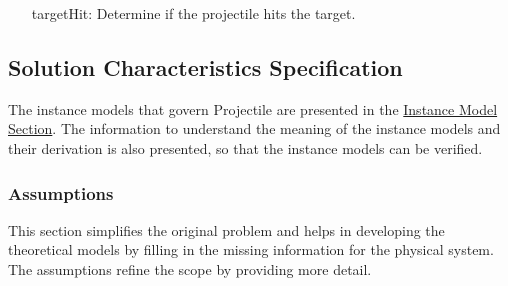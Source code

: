 \documentclass[12pt]{article}
\begin{document}
\begin{itemize}
\item[targetHit:\phantomsection\label{targetHit}]{Determine if the projectile hits the target.}
\end{itemize}
\subsection{Solution Characteristics Specification}
\label{Sec:SolCharSpec}
The instance models that govern Projectile are presented in the \hyperref[Sec:IMs]{Instance Model Section}. The information to understand the meaning of the instance models and their derivation is also presented, so that the instance models can be verified.

\subsubsection{Assumptions}
\label{Sec:Assumps}
This section simplifies the original problem and helps in developing the theoretical models by filling in the missing information for the physical system. The assumptions refine the scope by providing more detail.
\end{document}
